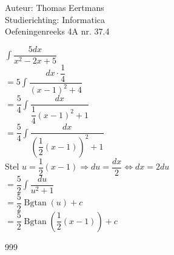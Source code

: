 \documentclass[a4paper]{article}
\newcommand{\Bgtan}{\operatorname{Bgtan}}
\begin{document}
  
\noindent \large Auteur: Thomas Eertmans \\
\noindent \large Studierichting: Informatica\\
\noindent \large Oefeningenreeks 4A nr. 37.4\\

\medskip

\normalsize

$\displaystyle\int \dfrac{5dx}{x^2-2x+5}$ \\

$= 5\displaystyle\int\dfrac{dx\cdot\dfrac{1}{4}}{(x-1)^2+4}$ \\

$= \dfrac{5}{4} \displaystyle\int\dfrac{dx}{\dfrac{1}{4}(x-1)^2+1}$ \\

$= \dfrac{5}{4} \displaystyle\int\dfrac{dx}{\left(\dfrac{1}{2}(x-1)\right)^2+1}$ \\

Stel $u = \dfrac{1}{2}(x-1)\Rightarrow du = \dfrac{dx}{2} \Leftrightarrow dx = 2du $\\

$= \dfrac{5}{2}\displaystyle\int \dfrac{du}{u^2+1}$ \\

$= \dfrac{5}{2} \Bgtan(u) + c$ \\

$= \dfrac{5}{2}\Bgtan\left(\dfrac{1}{2}(x-1)\right) +c$

\begin{thebibliography}{999}
\end{thebibliography}
\end{document}
